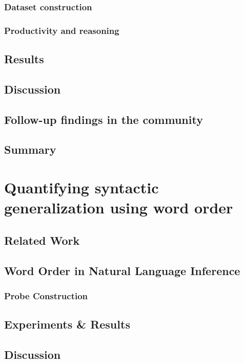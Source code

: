 \documentclass[letterpaper, 11pt]{article}
\begin{document}
\subsubsection{Dataset construction}
\label{sec:orgc974792}
\subsubsection{Productivity and reasoning}
\label{sec:org2df3d81}
\subsection{Results}
\label{sec:orga40a102}
\subsection{Discussion}
\label{sec:orgf18f0b5}
\subsection{Follow-up findings in the community}
\label{sec:org82f4696}
\subsection{Summary}
\label{sec:org75a8ffe}
\clearpage
\section{Quantifying syntactic generalization using word order}
\label{sec:orgdc11abe}

\subsection{Related Work}
\label{sec:org7d20b1f}
\subsection{Word Order in Natural Language Inference}
\label{sec:orgc53d29d}
\subsubsection{Probe Construction}
\label{sec:org2df2c43}
\subsection{Experiments \& Results}
\label{sec:orgdaa0470}
\subsection{Discussion}
\label{sec:orgac1b05a}
\end{document}
